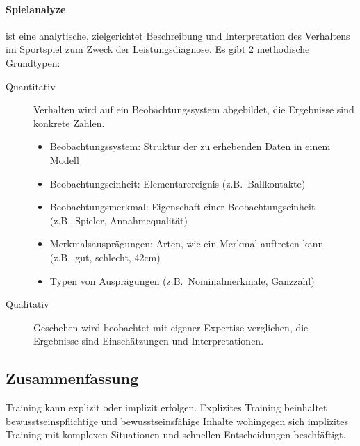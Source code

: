 \paragraph{Spielanalyze} ist eine analytische, zielgerichtet Beschreibung und Interpretation des Verhaltens im Sportspiel zum Zweck der Leistungsdiagnose.
Es gibt 2 methodische Grundtypen:
\begin{description}
  \item[Quantitativ] Verhalten wird auf ein Beobachtungssystem abgebildet, die Ergebnisse sind konkrete Zahlen.
    \begin{itemize}
      \item Beobachtungssystem: Struktur der zu erhebenden Daten in einem Modell
      \item Beobachtungseinheit: Elementarereignis (z.B.\ Ballkontakte)
      \item Beobachtungsmerkmal: Eigenschaft einer Beobachtungseinheit (z.B.\ Spieler, Annahmequalität)
      \item Merkmalsausprägungen: Arten, wie ein Merkmal auftreten kann (z.B.\ gut, schlecht, 42cm)
      \item Typen von Ausprägungen (z.B.\ Nominalmerkmale, Ganzzahl)
    \end{itemize}
  \item[Qualitativ] Geschehen wird beobachtet mit eigener Expertise verglichen, die Ergebnisse sind Einschätzungen und Interpretationen.
\end{description}

\subsection{Zusammenfassung}
Training kann explizit oder implizit erfolgen.
Explizites Training beinhaltet bewusstseinspflichtige und bewusstseinsfähige Inhalte wohingegen sich implizites Training mit komplexen Situationen und schnellen Entscheidungen beschfäftigt.
